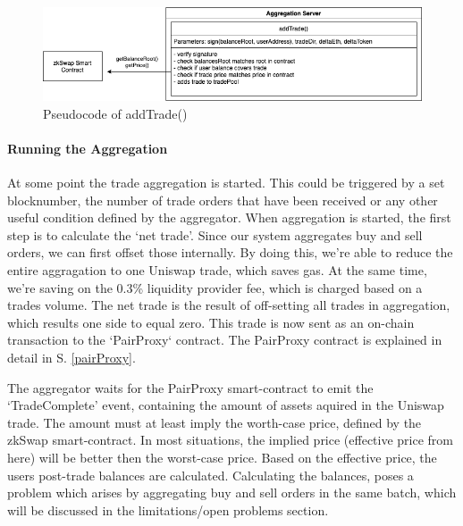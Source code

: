 \documentclass[../../thesis.tex]{subfiles}
\begin{document}
\begin{figure}[h]
    \centerline{\includegraphics[totalheight=3cm]{diagrams/addTrade.png}}
    \caption{Pseudocode of addTrade()}
    \label{fig:addTrade}
\end{figure}

\paragraph{Running the Aggregation}
At some point the trade aggregation is started. This could be triggered by a set blocknumber, the number of trade orders that have been received or any other useful condition defined by the aggregator. When aggregation is started, the first step is to calculate the `net trade'. Since our system aggregates buy and sell orders, we can first offset those internally. By doing this, we're able to reduce the entire aggragation to one Uniswap trade, which saves gas. At the same time, we're saving on the 0.3\% liquidity provider fee, which is charged based on a trades volume. The net trade is the result of off-setting all trades in aggregation, which results one side to equal zero. This trade is now sent as an on-chain transaction to the `PairProxy` contract. The PairProxy contract is explained in detail in S. \ref{pairProxy}. 

The aggregator waits for the PairProxy smart-contract to emit the `TradeComplete' event, containing the amount of assets aquired in the Uniswap trade. The amount must at least imply the worth-case price, defined by the zkSwap smart-contract. In most situations, the implied price (effective price from here) will be better then the worst-case price. Based on the effective price, the users post-trade balances are calculated. Calculating the balances, poses a problem which arises by aggregating buy and sell orders in the same batch, which will be discussed in the limitations/open problems section. 
\end{document}
